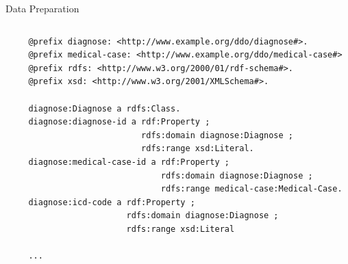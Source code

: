 \documentclass{beamer}
\begin{document}
\begin{frame}[fragile]{Data Preparation}
\begin{columns}
\begin{column}{.3\textwidth}
\end{column}%
\hfill%
\begin{column}{.66\textwidth}
{\tiny
\begin{verbatim}
@prefix diagnose: <http://www.example.org/ddo/diagnose#>.
@prefix medical-case: <http://www.example.org/ddo/medical-case#>
@prefix rdfs: <http://www.w3.org/2000/01/rdf-schema#>.
@prefix xsd: <http://www.w3.org/2001/XMLSchema#>.

diagnose:Diagnose a rdfs:Class.
diagnose:diagnose-id a rdf:Property ;
                       rdfs:domain diagnose:Diagnose ;
                       rdfs:range xsd:Literal.
diagnose:medical-case-id a rdf:Property ;
                           rdfs:domain diagnose:Diagnose ;
                           rdfs:range medical-case:Medical-Case.
diagnose:icd-code a rdf:Property ;
                    rdfs:domain diagnose:Diagnose ;
                    rdfs:range xsd:Literal

...
\end{verbatim}
}
\end{column}%
\end{columns}
\end{frame}
\end{document}
